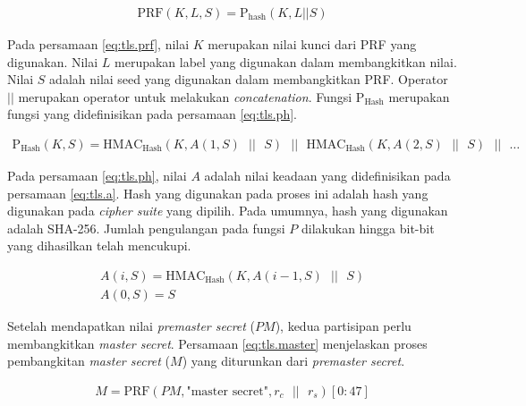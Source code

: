 \begin{equation}
  \label{eq:tls.prf}
  \begin{array}{l}   
    \text{PRF}(K, L, S) = \text{P}_\text{hash}(K, L || S)
  \end{array}
\end{equation}

Pada persamaan \ref{eq:tls.prf}, nilai $K$ merupakan nilai kunci dari PRF yang digunakan. Nilai $L$ merupakan label yang digunakan dalam membangkitkan nilai. Nilai $S$ adalah nilai seed yang digunakan dalam membangkitkan PRF. Operator $||$ merupakan operator untuk melakukan \emph{concatenation}. Fungsi $\text{P}_\text{Hash}$ merupakan fungsi yang didefinisikan pada persamaan \ref{eq:tls.ph}.

\begin{equation}
  \label{eq:tls.ph}
  \begin{array}{l}   
    \text{P}_\text{Hash}(K, S) = \text{HMAC}_\text{Hash}(K, A(1, S)\text{ }||\text{ }S)\text{ }||\text{ }
        \text{HMAC}_\text{Hash}(K, A(2, S)\text{ }||\text{ }S)\text{ }||\text{ }\ldots
  \end{array}
\end{equation}

Pada persamaan \ref{eq:tls.ph}, nilai $A$ adalah nilai keadaan yang didefinisikan pada persamaan \ref{eq:tls.a}. Hash yang digunakan pada proses ini adalah hash yang digunakan pada \emph{cipher suite} yang dipilih. Pada umumnya, hash yang digunakan adalah SHA-256. Jumlah pengulangan pada fungsi $P$ dilakukan hingga bit-bit yang dihasilkan telah mencukupi.

\begin{equation}
  \label{eq:tls.a}
  \begin{array}{l}   
    A(i, S) = \text{HMAC}_\text{Hash}(K, A(i-1, S)\text{ }||\text{ }S) \\
    A(0, S) = S
  \end{array}
\end{equation}

Setelah mendapatkan nilai \emph{premaster secret} ($PM$), kedua partisipan perlu membangkitkan \emph{master secret}. Persamaan \ref{eq:tls.master} menjelaskan proses pembangkitan \emph{master secret} ($M$) yang diturunkan dari \emph{premaster secret}.

\begin{equation}
  \label{eq:tls.master}
  \begin{array}{l}
    M = \text{PRF}(PM, \text{"master secret"}, r_c \text{ }||\text{ }r_s)[0:47]
  \end{array}
\end{equation}

